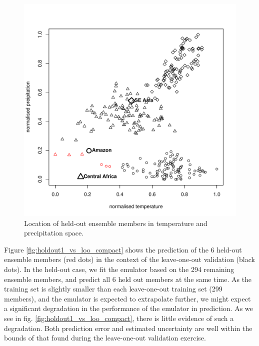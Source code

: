 \documentclass[gmd, manuscript]{copernicus} %
\begin{document}
\begin{figure}[t]
\includegraphics[width=12cm]{../graphics/figS01.pdf}
\caption{Location of held-out ensemble members in temperature and precipitation space.}
\label{fig:holdout1_location}
\end{figure}


Figure \ref{fig:holdout1_vs_loo_compact} shows the prediction of the 6 held-out ensemble members (red dots) in the context of the leave-one-out validation (black dots). In the held-out case, we fit the emulator based on the 294 remaining ensemble members, and predict all 6 held out members at the same time. As the training set is slightly smaller than each leave-one-out training set (299 members), and the emulator is expected to extrapolate further, we might expect a significant degradation in the performance of the emulator in prediction. As we see in fig. \ref{fig:holdout1_vs_loo_compact}, there is little evidence of such a degradation. Both prediction error and estimated uncertainty are well within the bounds of that found during the leave-one-out validation exercise.
\end{document}

